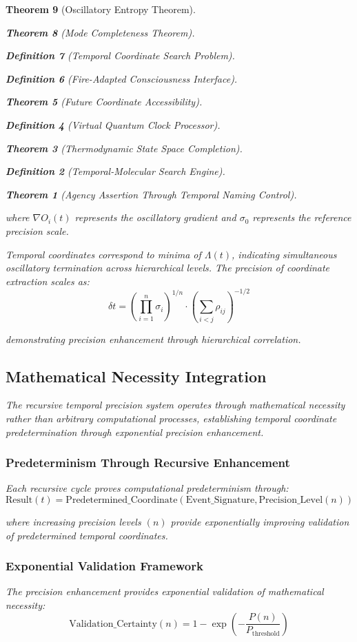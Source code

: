 \documentclass[12pt,a4paper]{article}
\newtheorem{theorem}{Theorem}[section]
\newtheorem{definition}[theorem]{Definition}
\begin{document}
\begin{theorem}[Oscillatory Entropy Theorem]
\begin{theorem}[Mode Completeness Theorem]
\begin{enumerate}
\begin{definition}[Temporal Coordinate Search Problem]
\begin{algorithm}
\begin{definition}[Fire-Adapted Consciousness Interface]
\begin{theorem}[Future Coordinate Accessibility]
\begin{definition}[Virtual Quantum Clock Processor]
\begin{itemize}
\begin{itemize}
\begin{theorem}[Thermodynamic State Space Completion]
\begin{definition}[Temporal-Molecular Search Engine]
\begin{theorem}[Agency Assertion Through Temporal Naming Control]
\begin{remark}
where $\nabla O_i(t)$ represents the oscillatory gradient and $\sigma_0$ represents the reference precision scale.

Temporal coordinates correspond to minima of $\Lambda(t)$, indicating simultaneous oscillatory termination across hierarchical levels. The precision of coordinate extraction scales as:
$$\delta t = \left(\prod_{i=1}^{n} \sigma_i\right)^{1/n} \cdot \left(\sum_{i<j} \rho_{ij}\right)^{-1/2}$$

demonstrating precision enhancement through hierarchical correlation.

\subsection{Mathematical Necessity Integration}

The recursive temporal precision system operates through mathematical necessity rather than arbitrary computational processes, establishing temporal coordinate predetermination through exponential precision enhancement.

\subsubsection{Predeterminism Through Recursive Enhancement}

Each recursive cycle proves computational predeterminism through:
\begin{equation}
\text{Result}(t) = \text{Predetermined\_Coordinate}(\text{Event\_Signature}, \text{Precision\_Level}(n))
\end{equation}

where increasing precision levels $(n)$ provide exponentially improving validation of predetermined temporal coordinates.

\subsubsection{Exponential Validation Framework}

The precision enhancement provides exponential validation of mathematical necessity:
\begin{equation}
\text{Validation\_Certainty}(n) = 1 - \exp\left(-\frac{P(n)}{P_{\text{threshold}}}\right)
\end{equation}


\end{remark}
\end{theorem}
\end{definition}
\end{theorem}
\end{itemize}
\end{itemize}
\end{definition}
\end{theorem}
\end{definition}
\end{algorithm}
\end{definition}
\end{enumerate}
\end{theorem}
\end{theorem}
\end{document}
